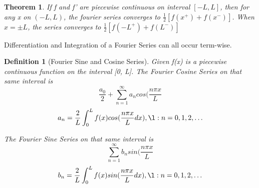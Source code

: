 \documentclass[12pt]{report}
\newtheorem{thm}{Theorem}
\newtheorem{dfn}{Definition}
\begin{document}
\begin{thm}
If f and f' are piecewise continuous on interval $[-L,L]$, then for any x on $(-L,L)$, the fourier series converges to $\frac{1}{2}[f(x^+)+f(x^-)]$. When $x=\pm L$, the series converges to $\frac{1}{2}[f(-L^+)+f(L^-)]$
\end{thm}

Differentiation and Integration of a Fourier Series can all occur term-wise.

\begin{dfn}[Fourier Sine and Cosine Series]
Given f(x) is a piecewise continuous function on the interval [0, L]. The Fourier Cosine Series on that same interval is
\begin{equation}
\frac{a_0}{2}+\sum^\infty_{n=1} a_n cos(\frac{n\pi x}{L}
\end{equation}
\begin{equation}
a_n=\frac{2}{L} \int^L_0 f(x) cos(\frac{n\pi x}{L}dx), \l: n=0,1,2,\ldots
\end{equation}

The Fourier Sine Series on that same interval is
\begin{equation}
\sum^\infty_{n=1} b_n sin(\frac{n\pi x}{L}
\end{equation}
\begin{equation}
b_n=\frac{2}{L} \int^L_0 f(x) sin(\frac{n\pi x}{L}dx), \l: n=0,1,2,\ldots
\end{equation}

\end{dfn}
\end{document}
